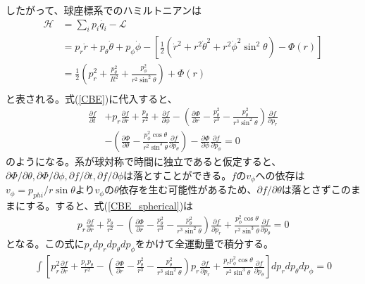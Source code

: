 したがって、球座標系でのハミルトニアンは
\begin{align}
	\mathcal{H} &= \sum_i p_i \dot{q_i} - \mathcal{L} \\
	&= p_r\dot{r} + p_{\theta}\dot{\theta} + p_{\phi}\dot{\phi} - \left[\frac{1}{2}(\dot{r}^2 + r^2\dot{\theta}^2 + r^2\dot{\phi}^2\sin^2\theta) - \Phi(r) \right] \\
	&= \frac{1}{2}\left(p_r^2 + \frac{p_{\theta}^2}{R^2} + \frac{p_{\phi}^2}{r^2\sin^2\theta}\right) + \Phi(r) \\
\end{align}
と表される。式(\ref{CBE})に代入すると、
\begin{align}
	\frac{\partial f}{\partial t} &+ p_r\frac{\partial f}{\partial r} + \frac{p_{\theta}}{r^2} + \frac{\partial f}{\partial \phi} - \left(\frac{\partial \Phi}{\partial r} - \frac{p_{\theta}^2}{r^3} - \frac{p_{\theta}^2}{r^3 \sin^2\theta}\right)\frac{\partial f}{\partial p_r} \\
	&- \left(\frac{\partial \Phi}{\partial \theta} - \frac{p^2_{\phi}\cos\theta}{r^2\sin^3\theta}\frac{\partial f}{\partial p_{\theta}}\right) - \frac{\partial \Phi}{\partial \phi}\frac{\partial f}{\partial p_\phi} = 0   \label{CBE_spherical}
\end{align}
のようになる。系が球対称で時間に独立であると仮定すると、$\partial\Phi/\partial\theta, \partial\Phi/\partial\phi, \partial f/\partial t, \partial f/\partial \phi$は落とすことができる。$f$の$v_{\phi}$への依存は$v_{\phi} = p_{phi}/r\sin\theta$より$v_{\phi}$の$\theta$依存を生む可能性があるため、$\partial f/\partial \theta$は落とさずこのままにする。すると、式(\ref{CBE_spherical})は
\begin{align}
	p_r\frac{\partial f}{\partial r} + \frac{p_{\theta}}{r^2} - \left(\frac{\partial \Phi}{\partial r} - \frac{p_{\theta}^2}{r^3} - \frac{p_{\theta}^2}{r^3 \sin^2\theta}\right)\frac{\partial f}{\partial p_r} + \frac{p^2_{\phi}\cos\theta}{r^2\sin^3\theta}\frac{\partial f}{\partial p_{\theta}} = 0
\end{align}
となる。この式に$p_r dp_r dp_{\theta} dp_{\phi}$をかけて全運動量で積分する。
\begin{align}
	\int \left[p_r^2 \frac{\partial f}{\partial r} + \frac{p_r p_{\theta}}{r^2} - \left(\frac{\partial \Phi}{\partial r} - \frac{p_{\theta}^2}{r^3} - \frac{p_{\theta}^2}{r^3 \sin^2\theta}\right) p_r \frac{\partial f}{\partial p_r} + \frac{p_r p^2_{\phi}\cos\theta}{r^2\sin^3\theta}\frac{\partial f}{\partial p_{\theta}} \right]dp_r dp_{\theta} dp_{\phi} = 0 \label{CBE_spherical_simple}
\end{align}

